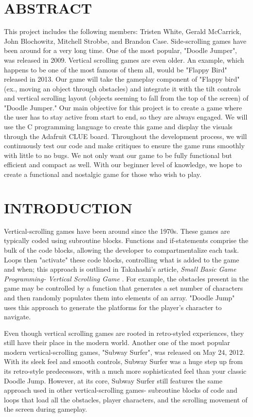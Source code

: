 \documentclass[12pt]{article}
\begin{document}
\section{ABSTRACT}
This project includes the following members: Tristen White, Gerald McCarrick, John Blochowitz, Mitchell Strobbe, and Brandon Case. Side-scrolling games have been around for a very long time. One of the most popular, "Doodle Jumper", was released in 2009. Vertical scrolling games are even older. An example, which happens to be one of the most famous of them all, would be "Flappy Bird" released in 2013. Our game will take the gameplay component of "Flappy bird" (ex., moving an object through obstacles) and integrate it with the tilt controls and vertical scrolling layout (objects seeming to fall from the top of the screen) of "Doodle Jumper." Our main objective for this project is to create a game where the user has to stay active from start to end, so they are always engaged. We will use the C programming language to create this game and display the visuals through the Adafruit CLUE board. Throughout the development process, we will continuously test our code and make critiques to ensure the game runs smoothly with little to no bugs. We not only want our game to be fully functional but efficient and compact as well. With our beginner level of knowledge, we hope to create a functional and nostalgic game for those who wish to play. 

\newpage
\section{INTRODUCTION}
Vertical-scrolling games have been around since the 1970s. These games are typically coded using subroutine blocks. Functions and if-statements comprise the bulk of the code blocks, allowing the developer to compartmentalize each task. Loops then "activate" these code blocks, controlling what is added to the game and when; this approach is outlined in Takahashi's article, \textit{Small Basic Game Programming- Vertical Scrolling Game} \parencite{basicgame}. For example, the obstacles present in the game may be controlled by a function that generates a set number of characters and then randomly populates them into elements of an array. "Doodle Jump" uses this approach to generate the platforms for the player's character to navigate.

Even though vertical scrolling games are rooted in retro-styled experiences, they still have their place in the modern world. Another one of the most popular modern vertical-scrolling games, "Subway Surfer", was released on May 24, 2012. With its sleek feel and smooth controls, Subway Surfer was a huge step up from its retro-style predecessors, with a much more sophisticated feel than your classic Doodle Jump. However, at its core, Subway Surfer still features the same approach used in other vertical-scrolling games- subroutine blocks of code and loops that load all the obstacles, player characters, and the scrolling movement of the screen during gameplay. 
\end{document}
